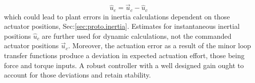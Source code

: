 \begin{equation}\label{eq:actuator-error}
\hat{u}_e=\vec{u}_c-\hat{u}_c
\end{equation}
which could lead to plant errors in inertia calculations dependent on those actuator positions, Sec:\ref{sec:proto.inertia}. Estimates for instantaneous inertial positions $\hat{u}_c$ are further used for dynamic calculations, not the commanded actuator positions $\vec{u}_c$. Moreover, the actuation error as a result of the minor loop transfer functions produce a deviation in expected actuation effort, those being force and torque inputs. A robust controller with a well designed gain ought to account for those deviations and retain stability.
